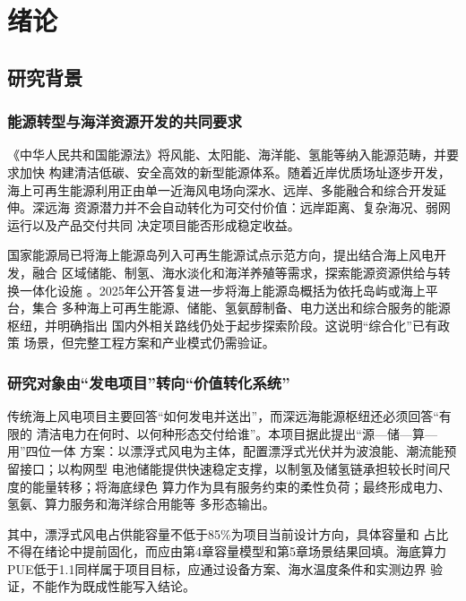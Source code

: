 \chapter{绪论}

\section{研究背景}

\subsection{能源转型与海洋资源开发的共同要求}

《中华人民共和国能源法》将风能、太阳能、海洋能、氢能等纳入能源范畴，并要求加快
构建清洁低碳、安全高效的新型能源体系\cite{energy-law}。随着近岸优质场址逐步开发，
海上可再生能源利用正由单一近海风电场向深水、远岸、多能融合和综合开发延伸。深远海
资源潜力并不会自动转化为可交付价值：远岸距离、复杂海况、弱网运行以及产品交付共同
决定项目能否形成稳定收益。

国家能源局已将海上能源岛列入可再生能源试点示范方向，提出结合海上风电开发，融合
区域储能、制氢、海水淡化和海洋养殖等需求，探索能源资源供给与转换一体化设施
\cite{nea-demo}。2025年公开答复进一步将海上能源岛概括为依托岛屿或海上平台，集合
多种海上可再生能源、储能、氢氨醇制备、电力送出和综合服务的能源枢纽，并明确指出
国内外相关路线仍处于起步探索阶段\cite{nea-energy-island}。这说明“综合化”已有政策
场景，但完整工程方案和产业模式仍需验证。

\subsection{研究对象由“发电项目”转向“价值转化系统”}

传统海上风电项目主要回答“如何发电并送出”，而深远海能源枢纽还必须回答“有限的
清洁电力在何时、以何种形态交付给谁”。本项目据此提出“源—储—算—用”四位一体
方案：以漂浮式风电为主体，配置漂浮式光伏并为波浪能、潮流能预留接口；以构网型
电池储能提供快速稳定支撑，以制氢及储氢链承担较长时间尺度的能量转移；将海底绿色
算力作为具有服务约束的柔性负荷；最终形成电力、氢氨、算力服务和海洋综合用能等
多形态输出。

其中，漂浮式风电占供能容量不低于85\%为项目当前设计方向\assumptiontag，具体容量和
占比不得在绪论中提前固化，而应由第4章容量模型和第5章场景结果回填。海底算力
PUE低于1.1同样属于项目目标\assumptiontag，应通过设备方案、海水温度条件和实测边界
验证，不能作为既成性能写入结论。

